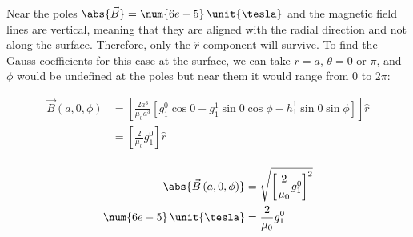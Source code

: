 \documentclass{article}
\begin{document}
{\begin{enumerate}
		Near the poles $\abs{\vec{B}} = \num{6e-5} \, \unit{\tesla}$ and the magnetic field lines are vertical, meaning that they are aligned with the radial direction and not along the surface. Therefore, only the $\hat{r}$ component will survive. To find the Gauss coefficients for this case at the surface, we can take $r = a$, $\theta = 0 \text{ or } \pi$, and $\phi$ would be undefined at the poles but near them it would range from $0$ to $2\pi$:
		
		
		\begin{equation*}
			\begin{split}
				\vec{B}(a,0,\phi) &= \left[ \frac{2a^3}{\mu_0 a^3} \left[ g^0_1 \cos 0 - g^1_1 \sin 0 \cos \phi - h^1_1 \sin 0 \sin \phi \right] \right] \hat{r} \\
				&= \left[ \frac{2}{\mu_0} g^0_1 \right] \hat{r} \\
			\end{split}
		\end{equation*}
		
		\begin{equation*}
			\begin{split}
				\abs{\vec{B}\left(a,0,\phi\right)} &= \sqrt{\left[ \frac{2}{\mu_0} g^0_1 \right]^2 } \\
				\num{6e-5} \, \unit{\tesla} &= \frac{2}{\mu_0} g^0_1
			\end{split}
		\end{equation*}
		

\end{enumerate}}
\end{document}
